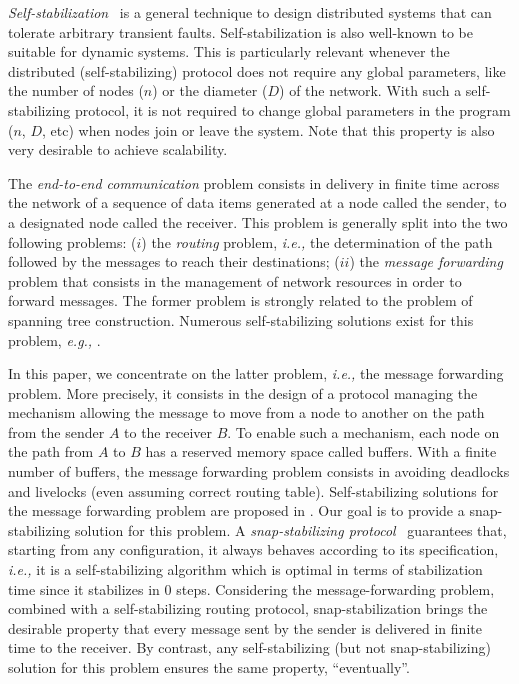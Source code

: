 \documentclass{llncs}
\newcommand{\eg}{\emph{e.g., }}
\newcommand{\ie}{\emph{i.e., }}
\begin{document}
{\em Self-stabilization}~\cite{D00} is a general technique to design distributed systems that 
can tolerate arbitrary transient faults.  Self-stabilization is also well-known to be suitable for dynamic systems. 
This is particularly relevant whenever the distributed (self-stabilizing) protocol does not require any global parameters,
like the number of nodes ($n$) or the diameter ($D$) of the network.  
With such a self-stabilizing protocol, it is not required to change 
global parameters in the program ($n$, $D$, etc) when nodes join or leave the system.  Note that this property 
is also very desirable to achieve scalability. 

The {\em end-to-end communication} problem consists in delivery in finite time across the network of a sequence of 
data items generated at a node called the sender, to a designated node called the receiver.
This problem is generally split into the two following problems:
($i$) the {\em routing} problem, \ie the determination of the path followed by the messages to reach their destinations;
($ii$) the {\em message forwarding} problem that consists in the management of network resources in order to forward messages. 
The former problem is strongly related to the problem of spanning tree construction. Numerous self-stabilizing solutions exist for this problem, \eg \cite{HC92,KK05,JT03}. 

In this paper, we concentrate on the latter problem, \ie the message forwarding problem.   
More precisely, it consists in the design of a protocol managing the mechanism allowing
the message to move from a node to another on the path from the sender $A$ to the receiver $B$.
To enable such a mechanism, each node on the path from $A$ to $B$ has a reserved memory space called buffers.
With a finite number of buffers, the message forwarding problem consists in avoiding deadlocks and livelocks (even
assuming correct routing table).
Self-stabilizing solutions for the message forwarding problem are proposed in \cite{APV96,KOR95}. 
Our goal is to provide a snap-stabilizing solution for this problem.
A {\em snap-stabilizing protocol}~\cite{Bui07}
guarantees that, starting from any configuration, it always behaves
according to its specification, \ie it is a
self-stabilizing algorithm which is optimal in terms of stabilization
time since it stabilizes in $0$ steps.
Considering the message-forwarding problem, combined with a self-stabilizing routing protocol, 
snap-stabilization brings the desirable property that 
every message sent by the sender is delivered in finite time to the receiver.
By contrast, any self-stabilizing (but not snap-stabilizing) solution for this problem
ensures the same property, ``eventually''. 
\end{document}
